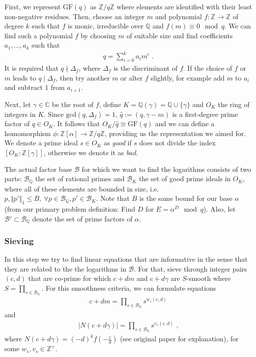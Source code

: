 \documentclass[paper=a4, fontsize=11pt]{scrartcl} %
\numberwithin{equation}{section} %
\numberwithin{figure}{section} %
\numberwithin{table}{section} %
\begin{document}
First, we represent $\mathrm{GF}(q)$ as $\mathbb{Z}/q\mathbb{Z}$ where elements are identified with their least non-negative residues. Then, choose an integer $m$ and polynomial $f:\mathbb{Z}\rightarrow\mathbb{Z}$ of degree $k$ such that $f$ is monic, irreducible over $\mathbb{Q}$ and $f(m)\equiv 0 \mod q$. We can find such a polynomial $f$ by choosing $m$ of suitable size and find coefficients $a_1,...,a_k$ such that
\begin{eqnarray}
q = \sum_{i=0}^{k}a_im^i
\text{ .}
\end{eqnarray}
It is required that $q\nmid\Delta_f$, where $\Delta_f$ is the discriminant of $f$. If the choice of $f$ or $m$ leads to $q\mid\Delta_f$, then try another $m$ or alter $f$ slightly, for example add $m$ to $a_i$ and subtract $1$ from $a_{i+1}$.

Next, let $\gamma\in\mathbb{C}$ be the root of $f$, define $K = \mathbb{Q}(\gamma) = \mathbb{Q}\cup\{\gamma\}$ and $O_K$ the ring of integers in $K$. Since $\mathrm{gcd}(q,\Delta_f) = 1$, $\hat{q}:=(q,\gamma-m)$ is a first-degree prime factor of $q\in O_K$. It follows that $O_K/\hat{q}\cong\mathrm{GF}(q)$ and we can define a homomorphism $\phi:\mathbb{Z}[\alpha]\rightarrow\mathbb{Z}/q\mathbb{Z}$, providing us the representation we aimed for. We denote a prime ideal $s\in O_K$ as \textit{good} if $s$ does not divide the index $[O_K:\mathbb{Z}[\gamma]]$, otherwise we denote it as \textit{bad}.

The actual factor base $\mathcal{B}$ for which we want to find the logarithms consists of two parts: $\mathcal{B}_\mathbb{Q}$ the set of rational primes and $\mathcal{B}_K$ the set of good prime ideals in $O_K$, where all of these elements are bounded in size, i.e. $p,\Vert p'\Vert_1\leq B,\ \forall p\in\mathcal{B}_\mathbb{Q},p'\in\mathcal{B}_K$. Note that $B$ is the same bound for our base $\alpha$ (from our primary problem definition: Find $D$ for $E=\alpha^D\mod q$). Also, let $\mathcal{B}'\subset\mathcal{B}_\mathbb{Q}$ denote the set of prime factors of $\alpha$.

\subsubsection{Sieving}
In this step we try to find linear equations that are informative in the sense that they are related to the the logarithms in $\mathcal{B}$. For that, sieve through integer pairs $(c,d)$ that are co-prime for which $c+dm$ and $c+d\gamma$ are $S$-smooth where $S = \prod_{s\in\mathcal{B}_\mathbb{Q}}$. For this smoothness criteria, we can formulate equations
\begin{eqnarray}
c+dm = \prod_{s\in\mathcal{B}_\mathbb{Q}}s^{w_s(c,d)}
\end{eqnarray}
and
\begin{eqnarray}
|N(c+d\gamma)| = \prod_{s\in\mathcal{B}_\mathbb{Q}}s^{v_s(c,d)}
\text{ ,}
\end{eqnarray}
where $N(c+d\gamma) = (-d)^kf(-\frac{c}{d})$ (see original paper \citep{gordon1993discrete} for explanation), for some $w_s,v_s\in\mathbb{Z}^+$.
\end{document}
